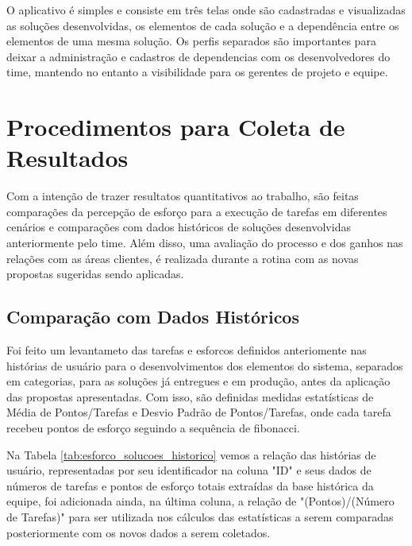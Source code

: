	O aplicativo é simples e consiste em três telas onde são cadastradas e visualizadas as soluções desenvolvidas, os elementos de cada solução e a dependência entre os elementos de uma mesma solução.
	Os perfis separados são importantes para deixar a administração e cadastros de dependencias com os desenvolvedores do time, mantendo no entanto a visibilidade para os gerentes de projeto e equipe.
	
	\section{Procedimentos para Coleta de Resultados}

	Com a intenção de trazer resultatos quantitativos ao trabalho, são feitas comparações da percepção de esforço para a execução de tarefas em diferentes cenários e
	comparações com dados históricos de soluções desenvolvidas anteriormente pelo time. Além disso, uma avaliação do processo e dos ganhos nas relações com as áreas clientes, é realizada durante a rotina com as novas propostas sugeridas sendo aplicadas.

	\subsection{Comparação com Dados Históricos}

	Foi feito um levantameto das tarefas e esforcos definidos anteriomente nas histórias de usuário para o desenvolvimentos dos elementos do sistema, separados em categorias,
	para as soluções já entregues e em produção, antes da aplicação das propostas apresentadas. Com isso, são definidas medidas estatísticas de Média de Pontos/Tarefas e Desvio Padrão de Pontos/Tarefas,
	onde cada tarefa recebeu pontos de esforço seguindo a sequência de fibonacci.
	
	Na Tabela \ref{tab:esforco_solucoes_historico} vemos a relação das histórias de usuário, representadas por seu identificador na coluna "ID" e seus dados de números de
	tarefas e pontos de esforço totais extraídas da	base histórica da equipe, foi adicionada ainda, na última coluna, a relação de "(Pontos)/(Número de Tarefas)" para ser
	utilizada nos cálculos das estatísticas a serem comparadas posteriormente com os novos dados a serem coletados.

